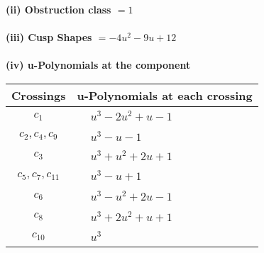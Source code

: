 \documentclass[1p]{elsarticle_modified}
\theoremstyle{definition}
\begin{document}
\flushleft \textbf{(ii) Obstruction class $= 1$}\\~\\
\flushleft \textbf{(iii) Cusp Shapes $= -4 u^2-9 u+12$}\\~\\
\newpage\renewcommand{\arraystretch}{1}
\flushleft \textbf{(iv) u-Polynomials at the component}\newline \\
\begin{tabular}{m{50pt}|m{274pt}}
Crossings & \hspace{64pt}u-Polynomials at each crossing \\
\hline $$\begin{aligned}c_{1}\end{aligned}$$&$\begin{aligned}
&u^3-2 u^2+u-1
\end{aligned}$\\
\hline $$\begin{aligned}c_{2},c_{4},c_{9}\end{aligned}$$&$\begin{aligned}
&u^3- u-1
\end{aligned}$\\
\hline $$\begin{aligned}c_{3}\end{aligned}$$&$\begin{aligned}
&u^3+u^2+2 u+1
\end{aligned}$\\
\hline $$\begin{aligned}c_{5},c_{7},c_{11}\end{aligned}$$&$\begin{aligned}
&u^3- u+1
\end{aligned}$\\
\hline $$\begin{aligned}c_{6}\end{aligned}$$&$\begin{aligned}
&u^3- u^2+2 u-1
\end{aligned}$\\
\hline $$\begin{aligned}c_{8}\end{aligned}$$&$\begin{aligned}
&u^3+2 u^2+u+1
\end{aligned}$\\
\hline $$\begin{aligned}c_{10}\end{aligned}$$&$\begin{aligned}
&u^3
\end{aligned}$\\
\hline
\end{tabular}\\~\\
\end{document}
